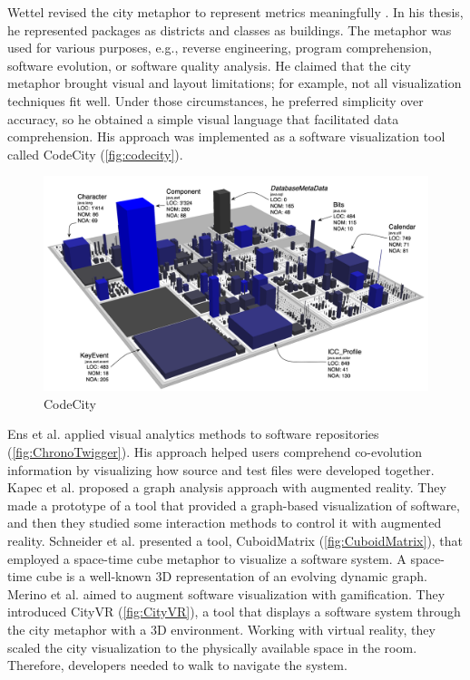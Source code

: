 Wettel revised the city metaphor to represent metrics meaningfully  \cite{Wettel2011}. 
In his thesis, he represented packages as districts and classes as buildings.
The metaphor was used for various purposes, e.g., reverse engineering, program comprehension, software evolution, or software quality analysis. 
He claimed that the city metaphor brought visual and layout limitations; for example, not all visualization techniques fit well.
Under those circumstances, he preferred simplicity over accuracy,
so he obtained a simple visual language that facilitated data comprehension. His approach was implemented as a software visualization tool 
called CodeCity (\autoref{fig:codecity}). 


\begin{figure}[ht]
\centering
  \includegraphics[width=0.9\linewidth]{CodeCity.png} 
  \caption{CodeCity}
  \label{fig:codecity}
\end{figure}

Ens et al. \cite{Ens2014} applied visual analytics methods to software repositories (\autoref{fig:ChronoTwigger}).
His approach helped users comprehend co-evolution information by visualizing how source and test files were developed together. 
Kapec et al. \cite{Kapec2015} proposed a graph analysis approach with augmented reality. 
They made a prototype of a tool that provided a graph-based visualization of software, and then they studied some interaction methods to control it with augmented reality.
Schneider et al. \cite{Schneider2016} presented a tool, CuboidMatrix (\autoref{fig:CuboidMatrix}), that employed a space-time cube metaphor to visualize a software system. 
A space-time cube is a well-known 3D representation of an evolving dynamic graph. 
Merino et al. \cite{Merino2017} aimed to augment software visualization with gamification. 
They introduced CityVR (\autoref{fig:CityVR}), a tool that displays a software system through the city metaphor with a 3D environment. 
Working with virtual reality, they scaled the city visualization to the physically available space in the room. 
Therefore, developers needed to walk to navigate the system. 

